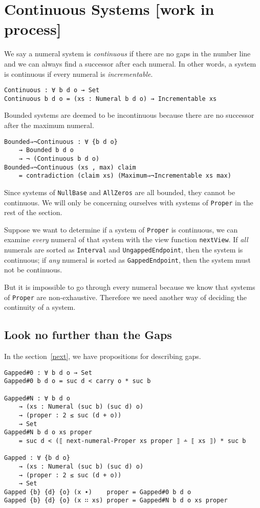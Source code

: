 \documentclass[\main/thesis.tex]{subfiles}
\begin{document}
\section{Continuous Systems [work in process]}\label{continuous}

We say a numeral system is \textit{continuous} if there are no gaps in the number
line and we can always find a successor after each numeral.
In other words, a system is continuous if every numeral is \textit{incrementable}.

\begin{lstlisting}
Continuous : ∀ b d o → Set
Continuous b d o = (xs : Numeral b d o) → Incrementable xs
\end{lstlisting}

Bounded systems are deemed to be incontinuous because there are no successor
after the maximum numeral.

\begin{lstlisting}
Bounded⇒¬Continuous : ∀ {b d o}
    → Bounded b d o
    → ¬ (Continuous b d o)
Bounded⇒¬Continuous (xs , max) claim
    = contradiction (claim xs) (Maximum⇒¬Incrementable xs max)
\end{lstlisting}

Since systems of \lstinline|NullBase| and \lstinline|AllZeros| are all bounded,
they cannot be continuous. We will only be concerning ourselves with systems of
\lstinline|Proper| in the rest of the section.

Suppose we want to determine if a system of \lstinline|Proper| is continuous,
we can examine \textit{every} numeral of that system with the view function
\lstinline|nextView|.
If \textit{all} numerals are sorted as \lstinline|Interval| and
\lstinline|UngappedEndpoint|, then the system is continuous;
if \textit{any} numeral is sorted as \lstinline|GappedEndpoint|,
then the system must not be continuous.

But it is impossible to go through every numeral because we know that systems
of \lstinline|Proper| are non-exhaustive.
Therefore we need another way of deciding the continuity of a system.

\subsection{Look no further than the Gaps}

In the section~\ref{next}, we have propositions for describing gaps.

\begin{lstlisting}
Gapped#0 : ∀ b d o → Set
Gapped#0 b d o = suc d < carry o * suc b

Gapped#N : ∀ b d o
    → (xs : Numeral (suc b) (suc d) o)
    → (proper : 2 ≤ suc (d + o))
    → Set
Gapped#N b d o xs proper
    = suc d < (⟦ next-numeral-Proper xs proper ⟧ ∸ ⟦ xs ⟧) * suc b

Gapped : ∀ {b d o}
    → (xs : Numeral (suc b) (suc d) o)
    → (proper : 2 ≤ suc (d + o))
    → Set
Gapped {b} {d} {o} (x ∙)    proper = Gapped#0 b d o
Gapped {b} {d} {o} (x ∷ xs) proper = Gapped#N b d o xs proper
\end{lstlisting}
\end{document}

